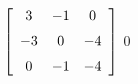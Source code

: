 {$\left[ \begin {array}{ccc} 3&-1&0\\\noalign{\medskip}-3&0&-4
\\\noalign{\medskip}0&-1&-4\end {array} \right]$} 
{$0$}

  

 

